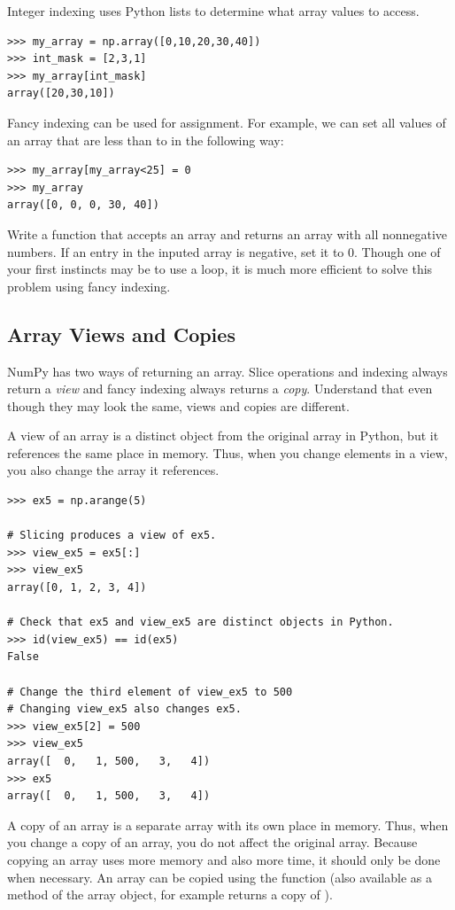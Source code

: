 Integer indexing uses Python lists to determine what array values to access.
\begin{lstlisting}
>>> my_array = np.array([0,10,20,30,40])
>>> int_mask = [2,3,1]
>>> my_array[int_mask]
array([20,30,10])
\end{lstlisting}

Fancy indexing can
be used for assignment. For example, we can set all values of an array
that are less than  to  in the following way:
\begin{lstlisting} 
>>> my_array[my_array<25] = 0
>>> my_array
array([0, 0, 0, 30, 40])
\end{lstlisting}

\begin{problem}
Write a function that accepts an array and returns an array with all nonnegative numbers. If an entry in the inputed array is negative, set it to $0$. Though one of your first instincts may be to use a  loop, it is much more efficient to solve this problem using fancy indexing.
\end{problem}

\subsection*{Array Views and Copies} 
NumPy has two ways of returning an array. Slice operations and indexing always return
a \emph{view} and fancy indexing always returns a \emph{copy}.
Understand that even though they may look the same, views and copies are different.


A view of an array is a distinct object from the original array in Python, but it references the same place in memory. 
Thus, when you change elements in a view, you also change the array it references.
\begin{lstlisting}
>>> ex5 = np.arange(5)

# Slicing produces a view of ex5. 
>>> view_ex5 = ex5[:]
>>> view_ex5
array([0, 1, 2, 3, 4])

# Check that ex5 and view_ex5 are distinct objects in Python.
>>> id(view_ex5) == id(ex5) 
False

# Change the third element of view_ex5 to 500
# Changing view_ex5 also changes ex5.
>>> view_ex5[2] = 500 
>>> view_ex5
array([  0,   1, 500,   3,   4])
>>> ex5 
array([  0,   1, 500,   3,   4])
\end{lstlisting} 

A copy of an array is a separate array with its own place in memory. 
Thus, when you change a copy of an array, you do not affect the original array. 
Because copying an array uses more memory and also more time, it should only be done when necessary. 
An array can be copied using the  function (also available as a method of 
the array object, for example  returns a copy of ). 

